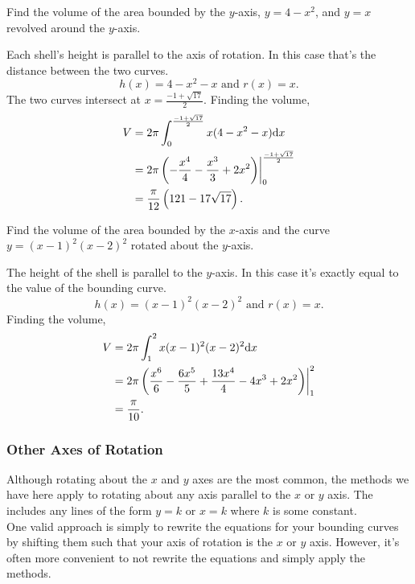 \begin{example}
	Find the volume of the area bounded by the $y$-axis, $y=4-x^2$, and $y=x$ revolved around the $y$-axis.
\end{example}
Each shell's height is parallel to the axis of rotation.
In this case that's the distance between the two curves.
\begin{equation*}
	h(x) = 4-x^2-x \text{ and } r(x)=x.
\end{equation*}
\indent
The two curves intersect at $x=\frac{-1+\sqrt{17}}{2}$.
Finding the volume,
\begin{align*}
	V &= 2\pi\int_{0}^{\frac{-1+\sqrt{17}}{2}}{x(4-x^2-x)\mathrm{d} x} \\
	&= 2\pi\left(-\frac{x^4}{4}-\frac{x^3}{3}+2x^2\right)\biggr\rvert_{0}^{\frac{-1+\sqrt{17}}{2}} \\
	&= \frac{\pi}{12}\left(121-17\sqrt{17}\right).
\end{align*}

\begin{example}
	Find the volume of the area bounded by the $x$-axis and the curve $y=(x-1)^2(x-2)^2$ rotated about the $y$-axis.
\end{example}
The height of the shell is parallel to the $y$-axis.
In this case it's exactly equal to the value of the bounding curve.
\begin{equation*}
	h(x)=(x-1)^2(x-2)^2 \text{ and } r(x)=x.
\end{equation*}
\indent
Finding the volume,
\begin{align*}
	V &= 2\pi\int_{1}^{2}{x(x-1)^2(x-2)^2\mathrm{d} x} \\
	&= 2\pi\left(\frac{x^6}{6}-\frac{6x^5}{5}+\frac{13x^4}{4}-4x^3+2x^2\right)\biggr\rvert_{1}^{2} \\
	&= \frac{\pi}{10}.
\end{align*}

\subsubsection{Other Axes of Rotation}
Although rotating about the $x$ and $y$ axes are the most common, the methods we have here apply to rotating about any axis parallel to the $x$ or $y$ axis.
The includes any lines of the form $y=k$ or $x=k$ where $k$ is some constant. \\

\noindent
One valid approach is simply to rewrite the equations for your bounding curves by shifting them such that your axis of rotation is the $x$ or $y$ axis.
However, it's often more convenient to not rewrite the equations and simply apply the methods.

